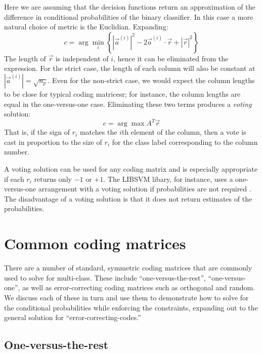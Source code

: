 \documentclass{article}
\newenvironment{eqnnon}{\begin{equation*}}{\end{equation*}}
\begin{document}
Here we are assuming that the decision functions return an approximation of the 
difference in conditional probabilities of the binary classifier.
In this case a more natural choice of metric is the Euclidian. Expanding:
\begin{eqnnon}
	c = \arg \min_i \left \lbrace |\vec a^{(i)}|^2 - 2 \vec a^{(i)} \cdot \vec r + |\vec r|^2 \right \rbrace
\end{eqnnon}
The length of $\vec r$ is independent of $i$, hence it can be eliminated from the expression.
For the strict case, the length of each column will also be constant at $|\vec a^{(i)}|=\sqrt{n_p}$.
Even for the non-strict case, we would expect the column lengths to be close for typical coding 
matricesr; for instance, the column lengths are equal in the one-versus-one case.
Eliminating these two terms produces a {\it voting} solution:
\begin{eqnnon}
	c = \arg \max A^T \vec r
\end{eqnnon}
That is, if the sign of $r_i$ matches the $i$th element of the column, then a vote is cast 
in proportion to the size of $r_i$ for the class label corresponding to the column number.

A voting solution can be used for any coding matrix and 
is especially appropriate if each $r_i$ returns only $-1$ or $+1$.  
The LIBSVM libary, for instance, uses a one-versus-one arrangement with a voting
solution if probabilities are not required \citep{Chang_Lin2011}.
The disadvantage of a voting solution is
that it does not return estimates of the probabilities.

\section{Common coding matrices}

There are a number of standard, symmetric coding matrices that are commonly used
to solve for multi-class.
These include ``one-versus-the-rest'', ``one-versus-one'',
as well as error-correcting coding matrices such as orthogonal and
random.
We discuss each of these in turn and
use them to demonstrate how to solve for the
conditional probabilities while enforcing the constraints,
expanding out to the general solution for ``error-correcting-codes.''

\subsection{One-versus-the-rest}
\end{document}
